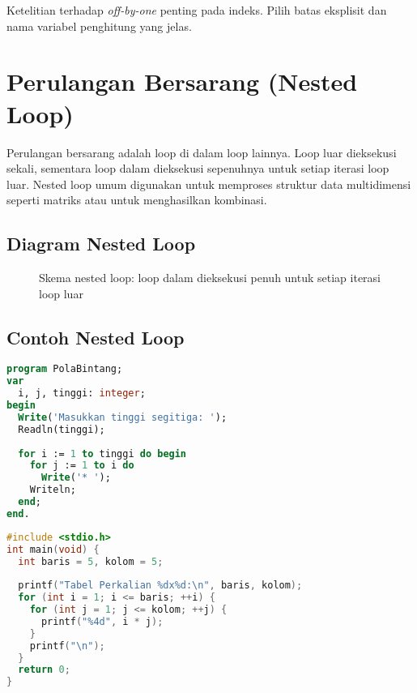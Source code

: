 \documentclass[../main.tex]{subfiles}
\begin{document}
Ketelitian terhadap \emph{off-by-one} penting pada indeks. Pilih batas eksplisit dan nama variabel penghitung yang jelas.

\section{Perulangan Bersarang (Nested Loop)}
Perulangan bersarang adalah loop di dalam loop lainnya. Loop luar dieksekusi sekali, sementara loop dalam dieksekusi sepenuhnya untuk setiap iterasi loop luar. Nested loop umum digunakan untuk memproses struktur data multidimensi seperti matriks atau untuk menghasilkan kombinasi.

\subsection{Diagram Nested Loop}
\begin{figure}[H]
  \centering
  \caption{Skema nested loop: loop dalam dieksekusi penuh untuk setiap iterasi loop luar}
\end{figure}

\subsection{Contoh Nested Loop}
\begin{lstlisting}[language=Pascal, caption={Pola segitiga dengan nested loop (Pascal)}]
program PolaBintang;
var
  i, j, tinggi: integer;
begin
  Write('Masukkan tinggi segitiga: ');
  Readln(tinggi);
  
  for i := 1 to tinggi do begin
    for j := 1 to i do
      Write('* ');
    Writeln;
  end;
end.
\end{lstlisting}

\begin{lstlisting}[language=C, caption={Tabel perkalian dengan nested loop (C)}]
#include <stdio.h>
int main(void) {
  int baris = 5, kolom = 5;
  
  printf("Tabel Perkalian %dx%d:\n", baris, kolom);
  for (int i = 1; i <= baris; ++i) {
    for (int j = 1; j <= kolom; ++j) {
      printf("%4d", i * j);
    }
    printf("\n");
  }
  return 0;
}
\end{lstlisting}
\end{document}
